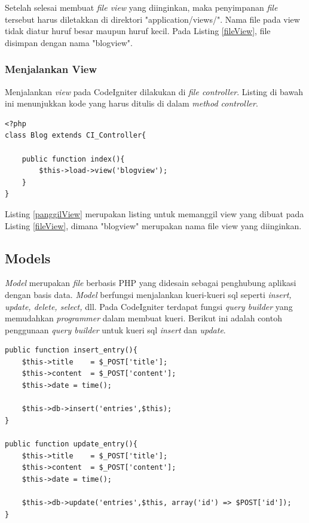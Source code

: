 	Setelah selesai membuat \textit{file view} yang diinginkan, maka penyimpanan \textit{file} tersebut harus diletakkan di direktori "application/views/". Nama file pada view tidak diatur huruf besar maupun huruf kecil. Pada Listing \ref{fileView}, file disimpan dengan nama "blogview".
	
	\subsubsection{Menjalankan View}
	\label{subsub: menjalankanView}
	
	Menjalankan \textit{view} pada CodeIgniter dilakukan di \textit{file controller}. Listing di bawah ini menunjukkan kode yang harus ditulis di dalam \textit{method controller}.
	
	\begin{lstlisting}[caption={Pemanggilan View}, label={panggilView}]
<?php
class Blog extends CI_Controller{
	
	public function index(){
		$this->load->view('blogview');
	}
}
	\end{lstlisting}
	
	Listing \ref{panggilView} merupakan listing untuk memanggil view yang dibuat pada Listing \ref{fileView}, dimana "blogview" merupakan nama file view yang diinginkan.
	
	\subsection{Models}
	\label{sub: models}
	
	\textit{Model} merupakan \textit{file} berbasis PHP yang didesain sebagai penghubung aplikasi dengan basis data. \textit{Model} berfungsi menjalankan kueri-kueri sql seperti \textit{insert, update, delete, select,} dll.
	Pada CodeIgniter terdapat fungsi \textit{query builder} yang memudahkan \textit {programmer} dalam membuat kueri. Berikut ini adalah contoh penggunaan \textit{query builder} untuk kueri sql \textit{insert} dan \textit{update}.
	
	\begin{lstlisting}[caption={Query Builder Insert dan Update}, label={QueriBuild}]
public function insert_entry(){
	$this->title	= $_POST['title'];
	$this->content	= $_POST['content'];
	$this->date	= time();
	
	$this->db->insert('entries',$this);
}

public function update_entry(){
	$this->title	= $_POST['title'];
	$this->content	= $_POST['content'];
	$this->date	= time();
	
	$this->db->update('entries',$this, array('id') => $POST['id']);
}
	\end{lstlisting}
	

